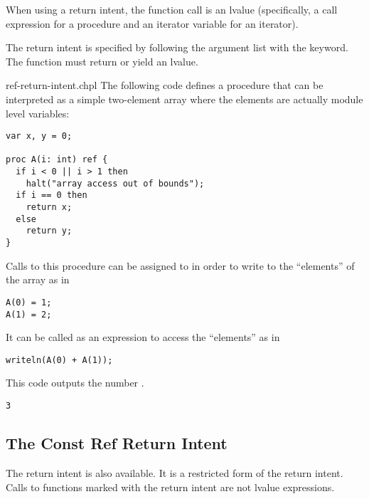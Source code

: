 When using a  return intent, the function call is an lvalue
(specifically, a call expression for a procedure and an iterator variable for
an iterator).

The  return intent is specified by following the argument list with
the  keyword.  The function must return or yield an lvalue.

\begin{chapelexample}{ref-return-intent.chpl}
The following code defines a procedure that can be interpreted as a
simple two-element array where the elements are actually module
level variables:
\begin{chapel}
\begin{verbatim}
var x, y = 0;

proc A(i: int) ref {
  if i < 0 || i > 1 then
    halt("array access out of bounds");
  if i == 0 then
    return x;
  else
    return y;
}
\end{verbatim}
\end{chapel}
Calls to this procedure can be assigned to in order to write to the ``elements''
of the array as in
\begin{chapel}
\begin{verbatim}
A(0) = 1;
A(1) = 2;
\end{verbatim}
\end{chapel}
It can be called as an expression to access the ``elements'' as in
\begin{chapel}
\begin{verbatim}
writeln(A(0) + A(1));
\end{verbatim}
\end{chapel}
This code outputs the number .

\begin{chapeloutput}
\begin{verbatim}
3
\end{verbatim}
\end{chapeloutput}
\end{chapelexample}


\subsection{The Const Ref Return Intent}
\label{Const_Ref_Return_Intent}

The  return intent is also available. It is a restricted
form of the  return intent. Calls to functions marked with
the  return intent are not lvalue expressions.

